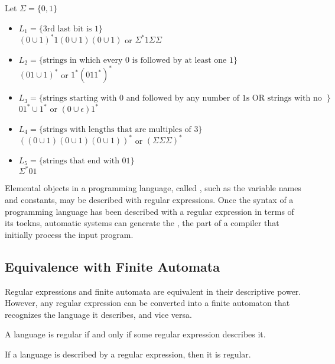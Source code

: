\documentclass{article}
\begin{document}
\begin{example}
  \item Let $\Sigma = \{0,1\}$
  \begin{itemize}
    \item $L_1 = \{\textrm{3rd last bit is 1}\}$ \\ 
      $(0 \cup 1)^{*} 1 (0 \cup 1) (0 \cup 1)$ or $\Sigma^{*}1\Sigma\Sigma$
  \item $L_2 = \{\textrm{strings in which every 0 is followed by at least one 1}\}$ \\
    $(0 1 \cup 1)^{*}$ or $1^{*}(011^{*})^{*}$
  \item $L_3 = \{\textrm{strings starting with 0 and followed by any number of 1s OR strings with no 0}\}$ \\ 
    $01^{*} \cup 1^{*}$ or $(0 \cup \epsilon)1^{*}$
  \item $L_4 = \{\textrm{strings with lengths that are multiples of 3}\}$ \\ 
    $((0 \cup 1) (0 \cup 1) (0 \cup 1))^{*}$ or $(\Sigma \Sigma \Sigma)^{*}$
  \item $L_5 = \{\textrm{strings that end with 01}\}$ \\ 
    $\Sigma^{*} 01$
  \end{itemize}
\end{example}

Elemental objects in a programming language, called , such as the variable names and constants, may be described with regular expressions. Once the syntax of a programming language has been described with a regular expression in terms of its toekns, automatic systems can generate the , the part of a compiler that initially process the input program.  

\subsection{Equivalence with Finite Automata}

Regular expressions and finite automata are equivalent in their descriptive power. However, any regular expression can be converted into a finite automaton that recognizes the language it describes, and vice versa. 

\begin{theorem}
  A language is regular if and only if some regular expression describes it.
\end{theorem}

\begin{lemma}
  If a language is described by a regular expression, then it is regular. 
\end{lemma}
\end{document}
